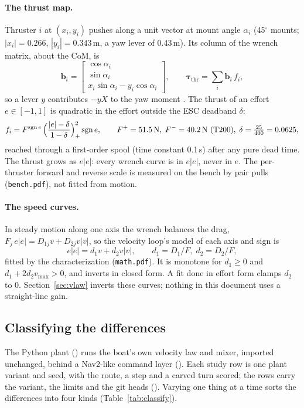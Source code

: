 \paragraph{The thrust map.} Thruster $i$ at $(x_i, y_i)$ pushes along a unit vector at mount
angle $\alpha_i$ (45$^\circ$ mounts; $|x_i| = 0.266$, $|y_i| = 0.343$\,m, a yaw lever of 0.43\,m).
Its column of the wrench matrix, about the CoM, is
\[
  \bm b_i = \begin{bmatrix} \cos\alpha_i \\ \sin\alpha_i \\ x_i \sin\alpha_i - y_i\cos\alpha_i \end{bmatrix},
  \qquad
  \bm\tau_\text{thr} = \sum_i \bm b_i\, f_i,
\]
so a lever $y$ contributes $-y X$ to the yaw moment . The thrust of an effort
$e \in [-1,1]$ is quadratic in the effort outside the ESC deadband $\delta$:
\[
  f_i = F^{\operatorname{sgn} e}\,\Big(\frac{|e| - \delta}{1 - \delta}\Big)_+^2 \operatorname{sgn} e ,
  \qquad F^{+} = 51.5\text{\,N},\; F^{-} = 40.2\text{\,N (T200)},\; \delta = \tfrac{25}{400} = 0.0625,
\]
reached through a first-order spool (time constant 0.1\,s) after any pure dead time. The
thrust grows as $e|e|$: every wrench curve is in $e|e|$, never in $e$. The per-thruster forward
and reverse scale is measured on the bench by pair pulls (\texttt{bench.pdf}), not fitted
from motion.

\paragraph{The speed curves.} In steady motion along one axis the wrench balances the drag,
$F_j\, e|e| = D_{1j} v + D_{2j} v|v|$, so the velocity loop's model of each axis and sign is
\[
  e|e| = d_1 v + d_2 v|v|,\qquad d_1 = D_1/F,\; d_2 = D_2/F,
\]
fitted by the characterization (\texttt{math.pdf}). It is monotone for $d_1 \ge 0$ and
$d_1 + 2 d_2 v_\text{max} > 0$, and inverts in closed form. A fit done in effort form clamps
$d_2$ to 0. Section~\ref{sec:vlaw} inverts these curves; nothing in this document uses a
straight-line gain.

\subsection{Classifying the differences}
\label{sec:classify}
The Python plant () runs the boat's own velocity law and mixer, imported
unchanged, behind a Nav2-like command layer (). Each study row is one plant
variant and seed, with the route, a step and a carved turn scored; the rows carry the
variant, the limits and the git heads (). Varying one thing at a time sorts the
differences into four kinds (Table~\ref{tab:classify}).

